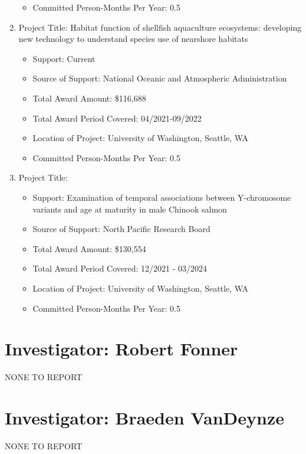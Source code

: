 \documentclass[12pt]{elsarticle}
\begin{document}
\begin{enumerate}
\begin{itemize}
\item Committed Person-Months Per Year: 0.5
\end{itemize}
\item Project Title: Habitat function of shellfish aquaculture ecosystems: developing new technology to understand species use of nearshore habitats
\begin{itemize}
\item Support: Current
\item Source of Support: National Oceanic and Atmospheric Administration
\item Total Award Amount: \$116,688
\item Total Award Period Covered: 04/2021-09/2022
\item Location of Project: University of Washington, Seattle, WA
\item Committed Person-Months Per Year: 0.5
\end{itemize}
\item Project Title: 
\begin{itemize}
\item Support: Examination of temporal associations between Y-chromosome variants and age at maturity in male Chinook salmon
\item Source of Support: North Pacific Research Board
\item Total Award Amount: \$130,554
\item Total Award Period Covered: 12/2021 - 03/2024
\item Location of Project: University of Washington, Seattle, WA
\item Committed Person-Months Per Year: 0.5
\end{itemize}
\end{enumerate}

\section*{Investigator: Robert Fonner}

\noindent NONE TO REPORT

\section*{Investigator: Braeden VanDeynze}

\noindent NONE TO REPORT
\end{document}
